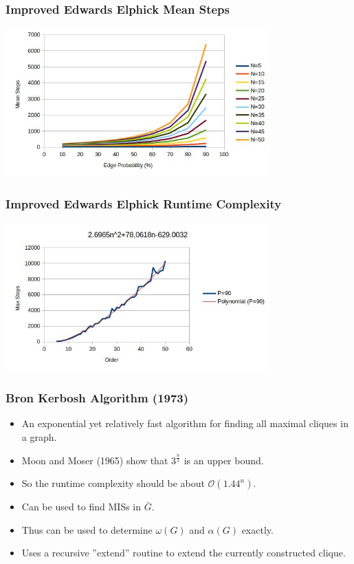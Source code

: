 \documentclass{beamer}
\renewcommand{\a}{\alpha}
\newcommand{\w}{\omega}
\newcommand{\BO}{\mathcal{O}}
\begin{document}
\begin{frame}
  \frametitle{Improved Edwards Elphick Mean Steps}
  \begin{center}
    \includegraphics[width=4in]{../final/edwards2_steps}
  \end{center}
\end{frame}

\begin{frame}
  \frametitle{Improved Edwards Elphick Runtime Complexity}
  \begin{center}
    \includegraphics[width=4in]{../final/edwards2_runtime}
  \end{center}
\end{frame}

\begin{frame}
  \frametitle{Bron Kerbosh Algorithm (1973)}
  \begin{itemize}
  \item An exponential yet relatively fast algorithm for finding all maximal cliques in a graph.
  \item Moon and Moser (1965) show that \(\displaystyle 3^{\frac{n}{3}}\) is an upper bound.
  \item So the runtime complexity should be about \(\BO(1.44^n)\).
  \item Can be used to find MISs in \(\bar{G}\).
  \item Thus can be used to determine \(\w(G)\) and \(\a(G)\) exactly.
  \item Uses a recursive ''extend'' routine to extend the currently constructed clique.
  \end{itemize}
\end{frame}
\end{document}

